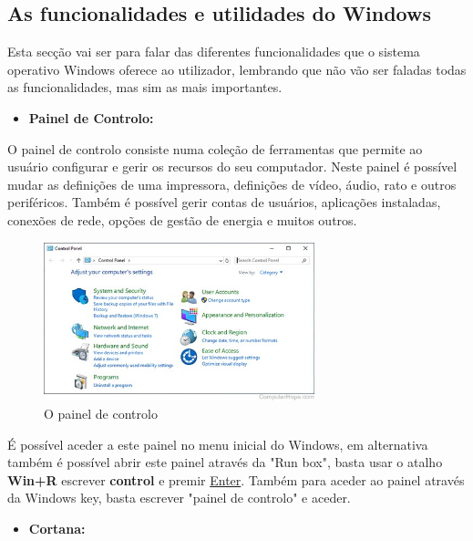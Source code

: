 \documentclass{report}
\begin{document}
\subsection{As funcionalidades e utilidades do Windows}
\label{sec.util}
Esta secção vai ser para falar das diferentes funcionalidades que o sistema operativo Windows oferece ao utilizador, lembrando que não vão ser faladas todas as funcionalidades, mas sim as mais importantes.

\begin{itemize}
    \item \textbf{Painel de Controlo:}
\end{itemize}

O painel de controlo consiste numa coleção de ferramentas que permite ao usuário configurar e gerir os recursos do seu computador. Neste painel é possível mudar as definições de uma impressora, definições de vídeo, áudio, rato e outros periféricos. Também é possível gerir contas de usuários, aplicações instaladas, conexões de rede, opções de gestão de energia e muitos outros.

\vspace{5mm}

\begin{figure}[h!]
\includegraphics[width=0.7\textwidth]{cpanel-win10.jpg}
\centering
\caption{O painel de controlo}
\end{figure}

\vspace{5mm}

É possível aceder a este painel no menu inicial do Windows, em alternativa também é possível abrir este painel através da "Run box", basta usar o atalho \textbf{Win+R} escrever \textbf{control} e premir \underline{Enter}. Também para aceder ao painel através da Windows key, basta escrever "painel de controlo" e aceder.

\begin{itemize}
    \item \textbf{Cortana:}
\end{itemize}
\end{document}
